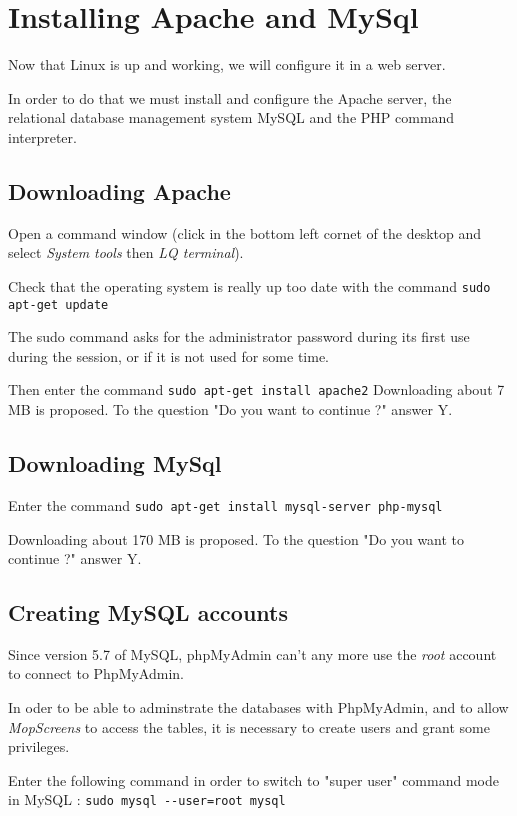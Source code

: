 \documentclass[a4paper]{ffco-rapport}
\begin{document}
\section{Installing Apache and MySql}
	Now that Linux is up and working, we will configure it in a web server.

	In order to do that we must install and configure the Apache server, the relational database management system MySQL and the PHP command interpreter.

	\subsection{Downloading Apache}
		Open a command window (click in the bottom left cornet of the desktop and select \emph{System tools} then \emph{LQ terminal}).

		Check that the operating system is really up too date with the command \verb|sudo apt-get update|

		The sudo command asks for the administrator password during its first use during the session, or if it is not used for some time.

		Then enter the command \verb|sudo apt-get install apache2| Downloading about 7 MB is proposed. To the question "Do you want to continue ?" answer Y.
		
	\subsection{Downloading MySql}

		Enter the command \verb|sudo apt-get install mysql-server php-mysql|
		
		Downloading about 170 MB is proposed.  To the question "Do you want to continue ?" answer Y.
		
	\subsection{Creating MySQL accounts}
		\label{lbl:utilmysql}
		Since version 5.7 of MySQL, phpMyAdmin can't any more use the \emph{root} account to connect to PhpMyAdmin.
		
		In oder to be able to adminstrate the databases with PhpMyAdmin, and to allow \emph{MopScreens} to access the tables, it is necessary to create users and grant some privileges.

		Enter the following command in order to switch to "super user" command mode in MySQL : \verb|sudo mysql --user=root mysql|
		
\end{document}
